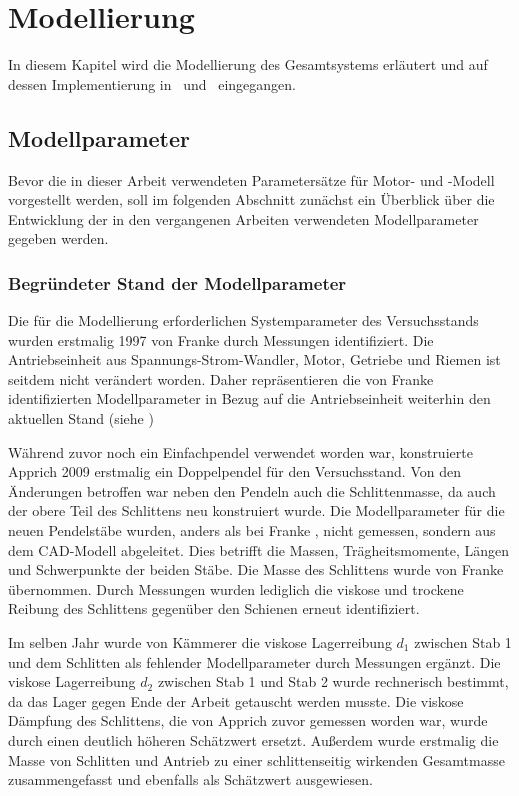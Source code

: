 \chapter{Modellierung}\label{cha:modell}

In diesem Kapitel wird die Modellierung des Gesamtsystems erläutert und auf dessen Implementierung in \ml\ und \Simulink\ eingegangen.





\section{Modellparameter}\label{sec:mparams}

Bevor die in dieser Arbeit verwendeten Parametersätze für Motor- und \spd-Modell vorgestellt werden, soll im folgenden Abschnitt zunächst ein Überblick über die Entwicklung der in den vergangenen Arbeiten verwendeten Modellparameter gegeben werden.  


\subsection{Begründeter Stand der Modellparameter}\label{subsec:paramshist}

Die für die Modellierung erforderlichen Systemparameter des Versuchsstands wurden erstmalig 1997 von Franke \cite{franke} durch Messungen identifiziert. Die Antriebseinheit aus Spannungs-Strom-Wandler, Motor, Getriebe und Riemen ist seitdem nicht verändert worden. Daher repräsentieren die von Franke \cite{franke} identifizierten Modellparameter in Bezug auf die Antriebseinheit weiterhin den aktuellen Stand (siehe )
   
Während zuvor noch ein Einfachpendel verwendet worden war, konstruierte Apprich \cite{apprich} 2009 erstmalig ein Doppelpendel für den Versuchsstand. Von den Änderungen betroffen war neben den Pendeln auch die Schlittenmasse, da auch der obere Teil des Schlittens neu konstruiert wurde. Die Modellparameter für die neuen Pendelstäbe wurden, anders als bei Franke \cite{franke}, nicht gemessen, sondern aus dem CAD-Modell abgeleitet. Dies betrifft die Massen, Trägheitsmomente, Längen und Schwerpunkte der beiden Stäbe. Die Masse des Schlittens wurde von Franke \cite{franke} übernommen. Durch Messungen wurden lediglich die viskose und trockene Reibung des Schlittens gegenüber den Schienen erneut identifiziert. 

Im selben Jahr wurde von Kämmerer \cite{kämmerer} die viskose Lagerreibung $d_1$ zwischen Stab 1 und dem Schlitten als fehlender Modellparameter durch Messungen ergänzt. Die viskose Lagerreibung $d_2$ zwischen Stab 1 und Stab 2 wurde rechnerisch bestimmt, da das Lager gegen Ende der Arbeit getauscht werden musste. Die viskose Dämpfung des Schlittens, die von Apprich \cite{apprich} zuvor gemessen worden war, wurde durch einen deutlich höheren Schätzwert ersetzt. Außerdem wurde erstmalig die Masse von Schlitten und Antrieb zu einer schlittenseitig wirkenden Gesamtmasse zusammengefasst und ebenfalls als Schätzwert ausgewiesen.

